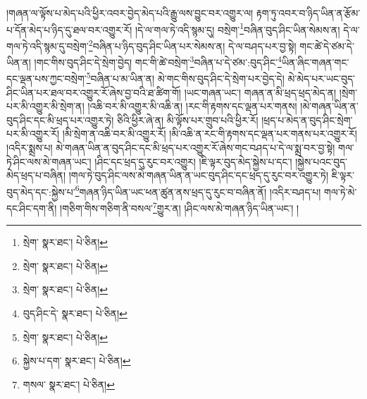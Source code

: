 །གཞན་ལ་ལྟོས་པ་མེད་པའི་ཕྱིར་འབར་བྱེད་མེད་པའི་རྒྱུ་ལས་བྱུང་བར་འགྱུར་ལ། རྟག་ཏུ་འབར་བ་ཉིད་ཡིན་ན་རྩོམ་པ་དོན་མེད་པ་ཉིད་དུ་ཐལ་བར་འགྱུར་རོ། །དེ་ལ་གལ་ཏེ་འདི་སྙམ་དུ། བསྲེག་\footnote{སྲེག་  སྣར་ཐང་།  པེ་ཅིན། }བཞིན་བུད་ཤིང་ཡིན་སེམས་ན། དེ་ལ་གལ་ཏེ་འདི་སྙམ་དུ་བསྲེག་\footnote{སྲེག་  སྣར་ཐང་།  པེ་ཅིན། }བཞིན་པ་ཉིད་བུད་ཤིང་ཡིན་པར་སེམས་ན། དེ་ལ་བཤད་པར་བྱ་སྟེ། གང་ཚེ་དེ་ཙམ་དེ་ཡིན་ན། །གང་གིས་བུད་ཤིང་དེ་སྲེག་བྱེད། གང་གི་ཚེ་བསྲེག་\footnote{སྲེག་  སྣར་ཐང་།  པེ་ཅིན། }བཞིན་པ་དེ་ཙམ་:བུད་ཤིང་\footnote{བུད་ཤིང་དེ་  སྣར་ཐང་།  པེ་ཅིན། }ཡིན་ཞིང་གཞན་གང་དང་ལྡན་པས་ཀྱང་བསྲེག་\footnote{སྲེག་  སྣར་ཐང་།  པེ་ཅིན། }བཞིན་པ་མ་ཡིན་ན། མེ་གང་གིས་བུད་ཤིང་དེ་སྲེག་པར་བྱེད་དེ། མེ་མེད་པར་ཡང་བུད་ཤིང་ཡིན་པར་ཐལ་བར་འགྱུར་རོ་ཞེས་བྱ་བའི་ཐ་ཚིག་གོ། །ཡང་གཞན་ཡང་། གཞན་ན་མི་ཕྲད་ཕྲད་མེད་ན། །སྲེག་པར་མི་འགྱུར་མི་སྲེག་ན། །འཆི་བར་མི་འགྱུར་མི་འཆི་ན། །རང་གི་རྟགས་དང་ལྡན་པར་གནས། །མེ་གཞན་ཡིན་ན་བུད་ཤིང་དང་མི་ཕྲད་པར་འགྱུར་ཏེ། ཅིའི་ཕྱིར་ཞེ་ན། མི་ལྟོས་པར་གྲུབ་པའི་ཕྱིར་རོ། །ཕྲད་པ་མེད་ན་བུད་ཤིང་སྲེག་པར་མི་འགྱུར་རོ། །མི་སྲེག་ན་འཆི་བར་མི་འགྱུར་རོ། །མི་འཆི་ན་རང་གི་རྟགས་དང་ལྡན་པར་གནས་པར་འགྱུར་རོ། །འདིར་སྨྲས་པ། མེ་གཞན་ཡིན་ན་བུད་ཤིང་དང་མི་ཕྲད་པར་འགྱུར་རོ་ཞེས་གང་བཤད་པ་དེ་ལ་སྨྲ་བར་བྱ་སྟེ། གལ་ཏེ་ཤིང་ལས་མེ་གཞན་ཡང་། །ཤིང་དང་ཕྲད་དུ་རུང་བར་འགྱུར། །ཇི་ལྟར་བུད་མེད་སྐྱེས་པ་དང་། །སྐྱེས་པའང་བུད་མེད་ཕྲད་པ་བཞིན། །གལ་ཏེ་བུད་ཤིང་ལས་མེ་གཞན་ཡིན་ན་ཡང་བུད་ཤིང་དང་ཕྲད་དུ་རུང་བར་འགྱུར་ཏེ། ཇི་ལྟར་བུད་མེད་དང་:སྐྱེས་པ་\footnote{སྐྱེས་པ་དག་  སྣར་ཐང་།  པེ་ཅིན། }གཞན་ཉིད་ཡིན་ཡང་ཕན་ཚུན་ནས་ཕྲད་དུ་རུང་བ་བཞིན་ནོ། །འདིར་བཤད་པ། གལ་ཏེ་མེ་དང་ཤིང་དག་ནི། །གཅིག་གིས་གཅིག་ནི་བསལ་\footnote{གསལ་  སྣར་ཐང་།  པེ་ཅིན། }གྱུར་ན། །ཤིང་ལས་མེ་གཞན་ཉིད་ཡིན་ཡང་། །
